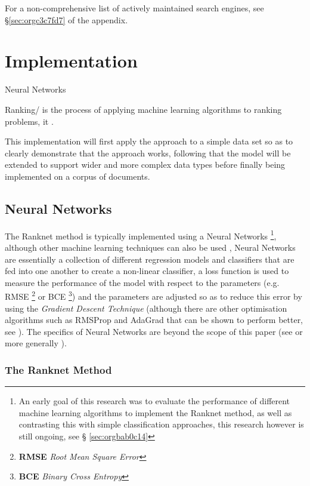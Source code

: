 \documentclass[a4paper,11pt,twoside]{article}
\begin{document}
For a non-comprehensive list of actively maintained search engines,
see \S \ref{sec:orgc3c7fd7} of the appendix.

\section{Implementation}
\label{sec:orgaaf6f78}



Neural Networks 

Ranking/ is the process of applying machine learning algorithms to
ranking problems, it .

This implementation will first apply the approach to a simple data
set so as to clearly demonstrate that the approach works, following
that the model will be extended to support wider and more complex
data types before finally being implemented on a corpus of documents.

\subsection{Neural Networks}
\label{sec:org8033a53}

The Ranknet method is typically implemented using a Neural Networks
\footnote{An early goal of this research was to evaluate the performance
of different machine learning algorithms to implement the Ranknet
method, as well as contrasting this with simple classification
approaches, this research however is still ongoing,  see \S
\ref{sec:orgbab0c14}},
although other machine learning techniques can also be used
\cite[p. 1]{christopherburgesRankNetRankingRetrospective2015},
Neural Networks are essentially a collection of different
regression models and classifiers that are fed into one another to create a
non-linear classifier, a loss function is used to measure the
performance of the model with respect to the parameters
(e.g. RMSE \footnote{\textbf{RMSE} \emph{Root Mean Square Error}} or BCE \footnote{\textbf{BCE} \emph{Binary Cross Entropy}}) and the parameters are adjusted so
as to reduce this error by using the \emph{Gradient Descent Technique}
(although there are other optimisation algorithms such as RMSProp
and AdaGrad \cite{mukkamalaVariantsRMSPropAdagrad2017} that can be
shown to perform better, see
\cite{bushaevUnderstandingRMSpropFaster2018}). The specifics of
Neural Networks are beyond the scope of this paper (see
\cite{hmkcodeBackpropagationStepStep} or more generally \cite{pictonNeuralNetworks1994}).

\subsubsection{The Ranknet Method}
\label{sec:org4c8a3dd}
\end{document}
